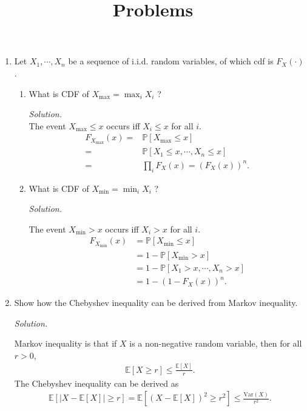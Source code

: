 \documentclass{article}
\title{Problems}
\begin{document}
\maketitle
\begin{enumerate}
\item Let $X_1,\cdots,X_n$ be a sequence of i.i.d. random variables, of which cdf is $F_X(\cdot)$.

\begin{enumerate}


\item What is CDF of $X_\text{max}=\max_i X_i$ ?

\emph{Solution.}\\

The event $X_\text{max}\leq x$ occurs iff $X_i\leq x$ for all $i$.
	\begin{align*}
	F_{X_\text{max}}(x)=&\mathbb{P}[X_\text{max}\leq x]\\
	=&	\mathbb{P}[X_1\leq x,\cdots,X_n\leq x]\\
	=&\prod_i F_X(x)=\left(F_X(x)\right)^n.
	\end{align*}

\item What is CDF of $X_\text{min}=\min_i X_i$ ?

\emph{Solution.}

The event $X_\text{min}>x$ occurs iff $X_i>x$ for all $i$.
	\begin{align*}
	F_{X_\text{min}}(x)&=\mathbb{P}[X_\text{min}\leq x]	\\
	&=1-\mathbb{P}[X_\text{min}>x]\\
	&=1-\mathbb{P}[X_1>x,\cdots,X_n>x]\\
	&=1-\left(1-F_X(x)\right)^n.
	\end{align*}
\end{enumerate}

\item Show how the Chebyshev inequality can be derived from Markov inequality.

\emph{Solution.}

Markov inequality is that if $X$ is a non-negative random variable, then for all $r>0$,
	\begin{align*}
	\mathbb{E}[X\geq r]\leq \frac{\mathbb{E}[X]}{r}.	
	\end{align*}
The Chebyshev inequality can be derived as
	\begin{align*}
	\mathbb{E}\left[ |X-\mathbb{E}[X]|\geq r\right]=\mathbb{E}\left[ (X-\mathbb{E}[X])^2\geq r^2\right]\leq \frac{\text{Var}(X)}{r^2}.
	\end{align*}
	

\end{enumerate}
\end{document}
